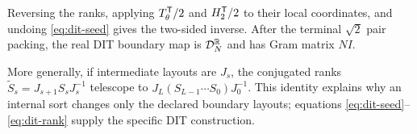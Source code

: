 \begin{corollary}
Reversing the ranks, applying $T_\theta^{\mathsf{T}}/2$ and $H_2^{\mathsf{T}}/2$ to
their local coordinates, and undoing \eqref{eq:dit-seed} gives the two-sided
inverse.  After the terminal $\sqrt2$ pair packing, the real DIT boundary map is
$\mathcal{D}_N^{\mathbb{R}}$ and has Gram matrix $NI$.
\end{corollary}

More generally, if intermediate layouts are $J_s$, the conjugated ranks
$\widetilde S_s=J_{s+1}S_sJ_s^{-1}$ telescope to
$J_L(S_{L-1}\cdots S_0)J_0^{-1}$.  This identity explains why an internal sort
changes only the declared boundary layouts; equations
\eqref{eq:dit-seed}--\eqref{eq:dit-rank} supply the specific DIT construction.
